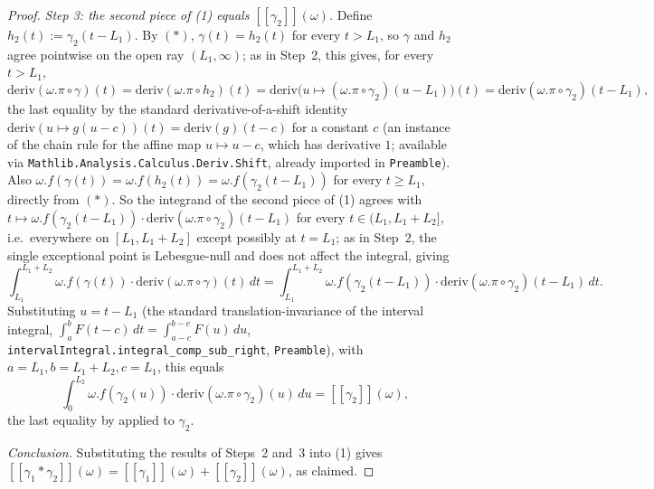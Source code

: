 \begin{proof}
  \emph{Step 3: the second piece of (1) equals $[[\gamma_2]](\omega)$.} Define $h_2(t) :=
  \gamma_2(t-L_1)$. By $(\ast)$, $\gamma(t) = h_2(t)$ for every $t > L_1$, so $\gamma$ and $h_2$
  agree pointwise on the open ray $(L_1,\infty)$; as in Step~2, this gives, for every $t > L_1$,
  \[
    \mathrm{deriv}(\omega.\pi\circ\gamma)(t) = \mathrm{deriv}(\omega.\pi\circ h_2)(t)
    = \mathrm{deriv}\bigl(u\mapsto (\omega.\pi\circ\gamma_2)(u-L_1)\bigr)(t)
    = \mathrm{deriv}(\omega.\pi\circ\gamma_2)(t-L_1)
    , \tag{3}
  \]
  the last equality by the standard derivative-of-a-shift identity
  $\mathrm{deriv}(u\mapsto g(u-c))(t) = \mathrm{deriv}(g)(t-c)$ for a constant $c$ (an instance of
  the chain rule for the affine map $u\mapsto u-c$, which has derivative $1$; available via
  \texttt{Mathlib.Analysis.Calculus.Deriv.Shift}, already imported in \texttt{Preamble}). Also
  $\omega.f(\gamma(t)) = \omega.f(h_2(t)) =
  \omega.f(\gamma_2(t-L_1))$ for every $t \ge L_1$, directly from $(\ast)$. So the integrand of the
  second piece of (1) agrees with $t\mapsto\omega.f(\gamma_2(t-L_1))\cdot
  \mathrm{deriv}(\omega.\pi\circ\gamma_2)(t-L_1)$ for every $t\in(L_1,L_1+L_2]$, i.e.\ everywhere on
  $[L_1,L_1+L_2]$ except possibly at $t=L_1$; as in Step~2, the single exceptional point is
  Lebesgue-null and does not affect the integral, giving
  \[
    \int_{L_1}^{L_1+L_2} \omega.f(\gamma(t)) \cdot \mathrm{deriv}(\omega.\pi\circ\gamma)(t)\,dt
    = \int_{L_1}^{L_1+L_2} \omega.f(\gamma_2(t-L_1)) \cdot \mathrm{deriv}(\omega.\pi\circ\gamma_2)(t-L_1)\,dt
    .
  \]
  Substituting $u = t - L_1$ (the standard translation-invariance of the interval integral,
  $\int_a^b F(t-c)\,dt = \int_{a-c}^{b-c} F(u)\,du$, \texttt{intervalIntegral.integral\_comp\_sub\_right},
  \texttt{Preamble}), with $a=L_1,b=L_1+L_2,c=L_1$, this equals
  \[
    \int_0^{L_2} \omega.f(\gamma_2(u)) \cdot \mathrm{deriv}(\omega.\pi\circ\gamma_2)(u)\,du
    = [[\gamma_2]](\omega)
    ,
  \]
  the last equality by  applied to $\gamma_2$.

  \emph{Conclusion.} Substituting the results of Steps~2 and~3 into (1) gives
  $[[\gamma_1*\gamma_2]](\omega) = [[\gamma_1]](\omega) + [[\gamma_2]](\omega)$, as claimed.
\end{proof}
